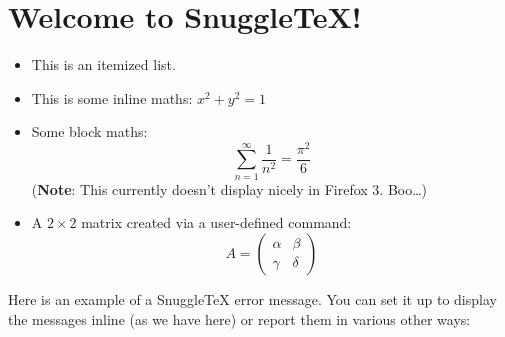 \section*{Welcome to SnuggleTeX!}

\begin{itemize}
  \item This is an itemized list.

  \item This is some inline maths: $x^2+ y^2 = 1$

  \item Some block maths:
        \[ \sum_{n=1}^\infty \frac{1}{n^2} = \frac{\pi^2}{6} \]
        (\textbf{Note}: This currently doesn't display nicely in Firefox 3. Boo\ldots)

  \item A $2\times 2$ matrix created via a user-defined command:
        \newcommand{\mat}[4]{\left( \begin{array}{cc} #1 & #2 \\ #3 & #4 \end{array} \right)}
        \[ A = \mat{\alpha}{\beta}{\gamma}{\delta} \]

\end{itemize}

Here is an example of a SnuggleTeX error message. You can set it up to display the messages inline (as we have here) or report them in various other ways:

\doh
